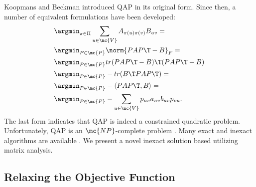 \documentclass[10pt,journal,cspaper,compsoc]{IEEEtran}
\newcommand{\PmcP}{P \in \mc{P}}
\begin{document}
Koopmans and Beckman \cite{Koopmans} introduced QAP in its original form.  Since then, a number of equivalent formulations have been developed:
\begin{align}
	 &\argmin_{\pi \in \Pi} \sum_{u \in \mc{V}} A_{\pi(u) \pi(v)} B_{uv} =\nonumber\\
	&\argmin_{\PmcP} \norm{PAP\T - B}_F =
	\nonumber\\
	&\argmin_{\PmcP} tr(PAP\T - B)\T (PAP\T - B) \nonumber \\
	&\argmin_{\PmcP} - tr(B\T PAP\T)=\nonumber\\ %
	&\argmin_{\PmcP}  -\langle PAP\T, B \rangle =
	\nonumber\\
	&\argmin_{\PmcP}  -\sum_{u \in \mc{V}} p_{uv} a_{uv} b_{uv} p_{vu}. \label{eq:qap}
\end{align}
The last form indicates that QAP is indeed a constrained quadratic problem.  Unfortunately, QAP is an $\mc{NP}$-complete problem \cite{Garey1979}.   Many exact and inexact algorithms are available \cite{Burkard2009}.  We present a novel inexact solution based utilizing matrix analysis.


\subsection{Relaxing the Objective Function} %
\label{sub:relaxing_the_objective_function}

\end{document}
